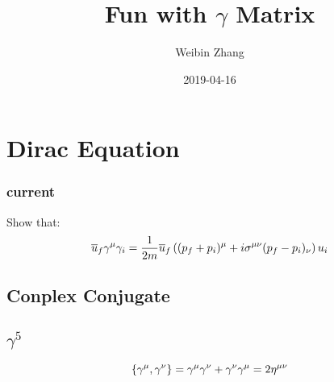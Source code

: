 \documentclass{report}
\title{Fun with $\gamma$ Matrix}
\author{Weibin Zhang}
\date{2019-04-16}
\begin{document}
\section{Dirac Equation}

\subsubsection{current}
Show that:
$$ \overline{u}_f \gamma^\mu \gamma_i = \frac{1}{2m}\overline{u}_f\left( (p_f + p_i)^\mu + i\sigma^{\mu\nu}(p_f - p_i)_\nu \right) u_i $$
\subsection{Conplex Conjugate}

\subsection{$\gamma^5$}
$$ \{\gamma^\mu, \gamma^\nu \} = \gamma^\mu\gamma^\nu + \gamma^\nu\gamma^\mu = 2\eta^{\mu\nu} $$

\end{document}
